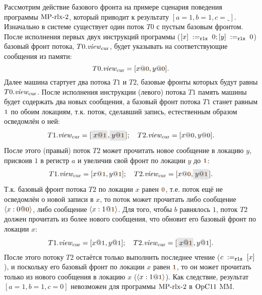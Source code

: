 Рассмотрим действие базового фронта на примере
сценария поведения
программы ${\rm MP\text{-}rlx\text{-}2}$,
который приводит к результату $[a = 1, b = 1, c = \_]$.
Изначально в системе существует один поток $T0$ с пустым базовым фронтом.
После исполнения первых двух инструкций программы
($[x] \;:=_{\mathtt{rlx}}\;0; [y] \;:=_{\mathtt{rlx}}\;0$) базовый фронт потока, $T0.\mathit{view}_{\mathrm{cur}}$, будет указывать на
соответствующие сообщения из памяти:
\[
T0.\Rcur = [x@\tstamp{0}, y@\tstamp{0}].
\]
Далее машина стартует два потока $T1$ и $T2$, базовые фронты которых будут равны $T0.\mathit{view}_{\mathrm{cur}}$.
После исполнения инструкции (левого) потока $T1$ память машины будет
содержать два новых сообщения,
а базовый фронт потока $T1$ станет равным $\tstamp{1}$ по обоим локациям,
т.к. поток, сделавший запись, естественным образом осведомлён о ней:
\[
\begin{array}{l}
T1.\Rcur = [\graybox{x@\tstamp{1}}, \graybox{y@\tstamp{1}}];
\quad T2.\Rcur = [x@\tstamp{0}, y@\tstamp{0}].
\end{array}
\]
После этого (правый) поток $T2$ может прочитать новое сообщение в локацию $y$,
присвоив $1$ в регистр $a$
и увеличив свой фронт по локации $y$ до $\tstamp{1}$:
\[
\begin{array}{l}
T1.\Rcur = [x@\tstamp{1}, y@\tstamp{1}];
\quad T2.\Rcur = [x@\tstamp{0}, \graybox{y@\tstamp{1}}].
\end{array}
\]
Т.к. базовый фронт потока $T2$ по локации $x$ равен $\tstamp{0}$, т.е. поток ещё не осведомлён о новой записи в $x$, то
поток может прочитать либо сообщение $\angled{x:0@\tstamp{0}}$, либо сообщение $\angled{x:1@\tstamp{1}}$.
Для того, чтобы $b$ равнялось $1$, поток $T2$ должен прочитать из более нового сообщения, что обновит его
базовый фронт по локации $x$:
\[
\begin{array}{l}
T1.\Rcur = [x@\tstamp{1}, y@\tstamp{1}];
\quad T2.\Rcur = [\graybox{x@\tstamp{1}}, y@\tstamp{1}].
\end{array}
\]
После этого потоку $T2$ остаётся только выполнить последнее чтение ($c \;:=_{\mathtt{rlx}}\;[x]$),
и поскольку его базовый фронт по локации $x$ равен $\tstamp{1}$, то он может прочитать только
из нового сообщения в локацию $x$ ($\angled{x:1@\tstamp{1}}$).
Как следствие, результат $[a = 1, b = 1, c = 0]$ невозможен для
программы ${\rm MP\text{-}rlx\text{-}2}$ в $\mathrm{OpC11}$ MM.


